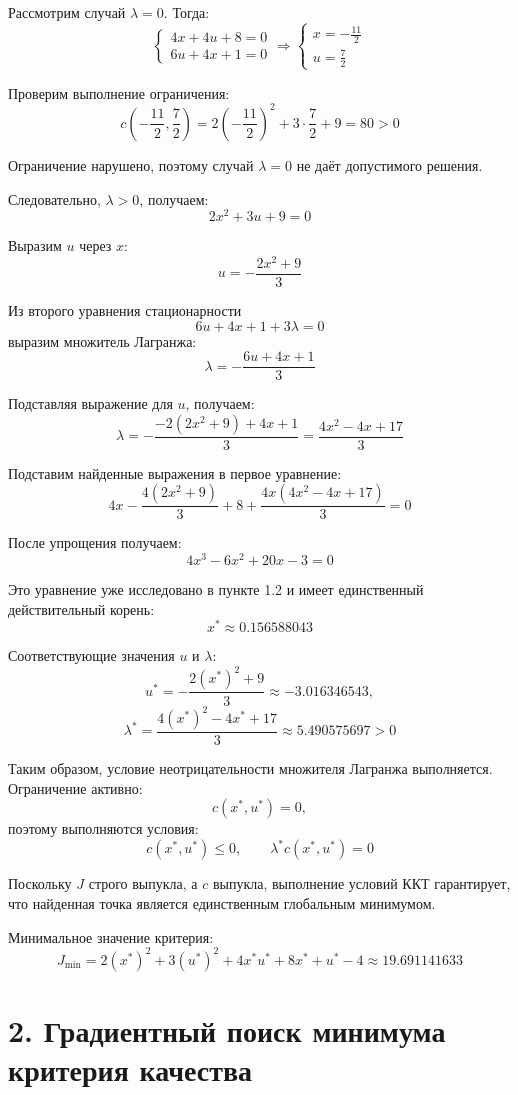 Рассмотрим случай \(\lambda=0\). Тогда:
\[
\begin{cases}
4x+4u+8=0\\
6u+4x+1=0
\end{cases}
\Rightarrow
\begin{cases}
x=-\frac{11}{2}\\[1ex]
u=\frac{7}{2}
\end{cases}
\]

Проверим выполнение ограничения:
\[
c\left(-\frac{11}{2},\frac{7}{2}\right)
=2\left(-\frac{11}{2}\right)^2
+3\cdot\frac{7}{2}+9
=80>0
\]

Ограничение нарушено, поэтому случай \(\lambda=0\)
не даёт допустимого решения.

Следовательно, \(\lambda>0\), получаем:
\[
2x^2+3u+9=0
\]

Выразим \(u\) через \(x\):
\[
u=-\frac{2x^2+9}{3}
\]

Из второго уравнения стационарности
\[
6u+4x+1+3\lambda=0
\]
выразим множитель Лагранжа:
\[
\lambda=-\frac{6u+4x+1}{3}
\]

Подставляя выражение для \(u\), получаем:
\[
\lambda
=-\frac{-2(2x^2+9)+4x+1}{3}
=\frac{4x^2-4x+17}{3}
\]


Подставим найденные выражения в первое уравнение:
\[
4x-\frac{4(2x^2+9)}{3}+8
+\frac{4x(4x^2-4x+17)}{3}=0
\]

После упрощения получаем:
\[
4x^3-6x^2+20x-3=0
\]

Это уравнение уже исследовано в пункте 1.2
и имеет единственный действительный корень:
\[
x^*\approx0.156588043
\]

Соответствующие значения \(u\) и \(\lambda\):
\[
u^*=-\frac{2(x^*)^2+9}{3}
\approx-3.016346543,
\]
\[
\lambda^*=\frac{4(x^*)^2-4x^*+17}{3}
\approx5.490575697>0
\]

Таким образом, условие неотрицательности множителя
Лагранжа выполняется. Ограничение активно:
\[
c(x^*,u^*)=0,
\]
поэтому выполняются условия:
\[
c(x^*,u^*)\leq0,
\qquad
\lambda^*c(x^*,u^*)=0
\]

Поскольку \(J\) строго выпукла, а \(c\) выпукла, выполнение условий ККТ гарантирует, что найденная точка является единственным глобальным минимумом.

Минимальное значение критерия:
\[
J_{\min}
=2(x^*)^2+3(u^*)^2+4x^*u^*+8x^*+u^*-4
\approx19.691141633
\]

\section*{2. Градиентный поиск минимума критерия качества}

